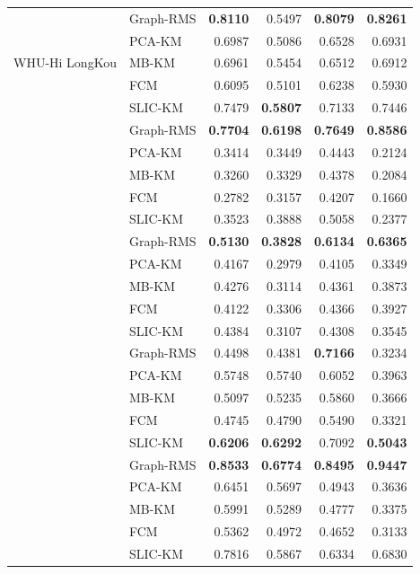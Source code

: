 \documentclass[10pt,a4paper,fleqn]{article}
\begin{document}
\begin{table}[!t]
\begin{tabular}{@{}llrrrr@{}}
\multirow{5}{*}{WHU-Hi LongKou}
& Graph-RMS & \textbf{0.8110} & 0.5497 & \textbf{0.8079} & \textbf{0.8261} \\
& PCA-KM    & 0.6987 & 0.5086 & 0.6528 & 0.6931 \\
& MB-KM     & 0.6961 & 0.5454 & 0.6512 & 0.6912 \\
& FCM       & 0.6095 & 0.5101 & 0.6238 & 0.5930 \\
& SLIC-KM   & 0.7479 & \textbf{0.5807} & 0.7133 & 0.7446 \\
\addlinespace[2pt]

\multirow{5}{*}{WHU-Hi HongHu}
& Graph-RMS & \textbf{0.7704} & \textbf{0.6198} & \textbf{0.7649} & \textbf{0.8586} \\
& PCA-KM    & 0.3414 & 0.3449 & 0.4443 & 0.2124 \\
& MB-KM     & 0.3260 & 0.3329 & 0.4378 & 0.2084 \\
& FCM       & 0.2782 & 0.3157 & 0.4207 & 0.1660 \\
& SLIC-KM   & 0.3523 & 0.3888 & 0.5058 & 0.2377 \\
\addlinespace[2pt]

\multirow{5}{*}{WHU-Hi HanChuan}
& Graph-RMS & \textbf{0.5130} & \textbf{0.3828} & \textbf{0.6134} & \textbf{0.6365} \\
& PCA-KM    & 0.4167 & 0.2979 & 0.4105 & 0.3349 \\
& MB-KM     & 0.4276 & 0.3114 & 0.4361 & 0.3873 \\
& FCM       & 0.4122 & 0.3306 & 0.4366 & 0.3927 \\
& SLIC-KM   & 0.4384 & 0.3107 & 0.4308 & 0.3545 \\
\addlinespace[2pt]

\multirow{5}{*}{Botswana}
& Graph-RMS & 0.4498 & 0.4381 & \textbf{0.7166} & 0.3234 \\
& PCA-KM    & 0.5748 & 0.5740 & 0.6052 & 0.3963 \\
& MB-KM     & 0.5097 & 0.5235 & 0.5860 & 0.3666 \\
& FCM       & 0.4745 & 0.4790 & 0.5490 & 0.3321 \\
& SLIC-KM   & \textbf{0.6206} & \textbf{0.6292} & 0.7092 & \textbf{0.5043} \\
\addlinespace[2pt]

\multirow{5}{*}{Trento}
& Graph-RMS & \textbf{0.8533} & \textbf{0.6774} & \textbf{0.8495} & \textbf{0.9447} \\
& PCA-KM    & 0.6451 & 0.5697 & 0.4943 & 0.3636 \\
& MB-KM     & 0.5991 & 0.5289 & 0.4777 & 0.3375 \\
& FCM       & 0.5362 & 0.4972 & 0.4652 & 0.3133 \\
& SLIC-KM   & 0.7816 & 0.5867 & 0.6334 & 0.6830 \\
\midrule


\end{tabular}
\end{table}
\end{document}
